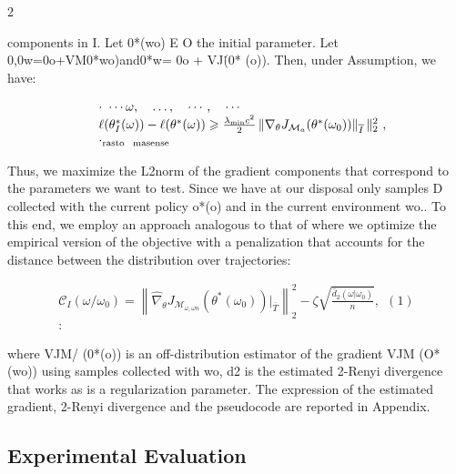 \documentclass{article}
\begin{document}
\sloppy

\begin{paracol}{2}
\RaggedRight

components in I. Let 0*(wo) E O the initial parameter.
Let 0,0w=0o+VM0*wo)and0*w=
0o + VJ\. (0* (o)). Then, under Assumption, we have:


\begin{equation}
\begin{array} { r l } & { \cdot ~ \cdots \omega, \quad \dots, \quad \cdots, \quad \cdots } \\ & { \ell ( \theta _ { I } ^ { * } ( \omega ) ) - \ell ( \theta ^ { * } ( \omega ) ) \geqslant \frac { \lambda _ { \operatorname* { m i n } } c ^ { 2 } } { 2 } \left \| \nabla _ { \theta } J _ { \mathcal { M } _ { a } } ( \theta ^ { * } ( \omega _ { 0 } ) ) \right \| _ { \overline { I } } \| _ { 2 } ^ { 2 } ~, } \\ & { \cdot _ { \mathrm { r a s t o ~ ~ m a s e n s e}}}\end{array}
\end{equation}


Thus, we maximize the L2norm of the gradient components that correspond to the parameters we want to test.
Since we have at our disposal only samples D collected with
the current policy o*(o) and in the current environment wo..
To this end, we employ an approach analogous to that of
where we optimize the empirical version of the objective
with a penalization that accounts for the distance between
the distribution over trajectories:


\begin{equation}
\begin{array} { r } { \mathcal { C } _ { I } ( \omega / \omega _ { 0 } ) = \left \| \hat { \nabla } _ { \theta } J _ { \mathcal { M } _ { \omega, \omega n } } ( \theta ^ { * } ( \omega _ { 0 } ) ) | _ { \overline { T } } \right \| _ { 2 } ^ { 2 } - \zeta \sqrt { \frac { \widehat { d } _ { 2 } ( \omega | \omega _ { 0 } ) } { n } }, ~ ~ ( 1 ) } \\ { : ~ }\end{array}
\end{equation}


where VJM/ (0*(o)) is an off-distribution estimator of
the gradient VJM (O*(wo)) using samples collected with
wo, d2 is the estimated 2-Renyi divergence that works as
is a regularization parameter. The expression of the estimated gradient, 2-Renyi divergence and the pseudocode are
reported in Appendix.


\subsection*{Experimental Evaluation}



\end{paracol}
\end{document}
